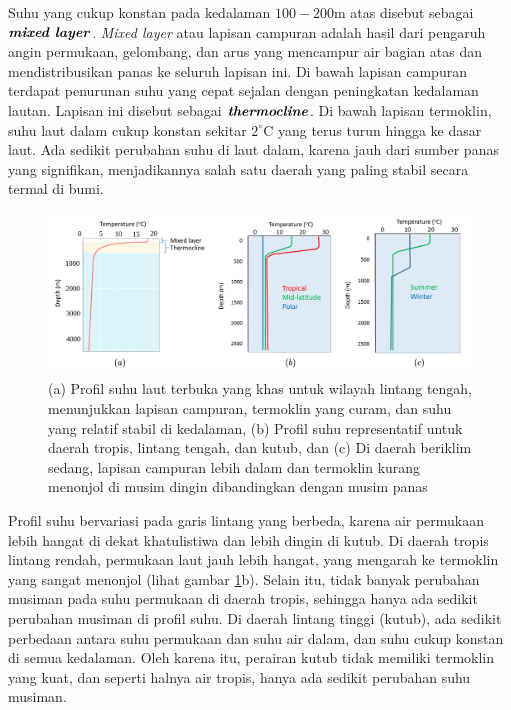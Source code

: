 \begin{spacing}{1.5}
	Suhu yang cukup konstan pada kedalaman $100 - 200$m atas disebut sebagai $\textbf{\textit{mixed layer}}$. \textit{Mixed layer} atau lapisan campuran adalah hasil dari pengaruh angin permukaan, gelombang, dan arus yang mencampur air bagian atas dan mendistribusikan panas ke seluruh lapisan ini. Di bawah lapisan campuran terdapat penurunan suhu yang cepat sejalan dengan peningkatan kedalaman lautan. Lapisan ini disebut sebagai $\textbf{\textit{thermocline}}$. Di bawah lapisan termoklin, suhu laut dalam cukup konstan sekitar $2^\circ$C yang terus turun hingga ke dasar laut. Ada sedikit perubahan suhu di laut dalam, karena jauh dari sumber panas yang signifikan, menjadikannya salah satu daerah yang paling stabil secara termal di bumi.
	\begin{figure}[H]
		\centering
		\includegraphics[width=15cm]{contents/mld_theory}
		\caption{(a) Profil suhu laut terbuka yang khas untuk wilayah lintang tengah, menunjukkan lapisan campuran, termoklin yang curam, dan suhu yang relatif stabil di kedalaman, (b) Profil suhu representatif untuk daerah tropis, lintang tengah, dan kutub, dan (c) Di daerah beriklim sedang, lapisan campuran lebih dalam dan termoklin kurang menonjol di musim dingin dibandingkan dengan musim panas  \protect{}}
		\label{fig:mld_theory}
	\end{figure}
	 Profil suhu bervariasi pada garis lintang yang berbeda, karena air permukaan lebih hangat di dekat khatulistiwa dan lebih dingin di kutub. Di daerah tropis lintang rendah, permukaan laut jauh lebih hangat, yang mengarah ke termoklin yang sangat menonjol (lihat gambar \ref{fig:mld_theory}b). Selain itu, tidak banyak perubahan musiman pada suhu permukaan di daerah tropis, sehingga hanya ada sedikit perubahan musiman di profil suhu. Di daerah lintang tinggi (kutub), ada sedikit perbedaan antara suhu permukaan dan suhu air dalam, dan suhu cukup konstan di semua  kedalaman. Oleh karena itu, perairan kutub tidak memiliki termoklin yang kuat, dan seperti halnya air tropis, hanya ada sedikit perubahan suhu musiman. 
	 

\end{spacing}
